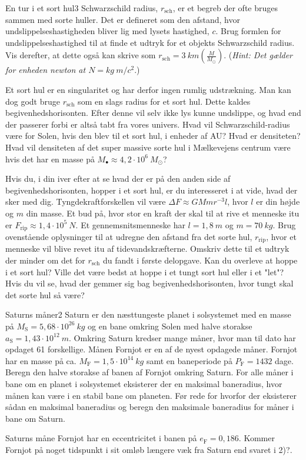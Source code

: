 \begin{opgave}{En tur i et sort hul}{3}
Schwarzschild radius, $r_\text{sch}$, er et begreb der ofte bruges sammen med sorte huller. Det er defineret som den afstand, hvor undslippelseshastigheden bliver lig med lysets hastighed, $c$.
	\opg Brug formlen for undslippelseshastighed til at finde et udtryk for et objekts Schwarzschild radius. Vis derefter, at dette også kan skrive som $r_\text{sch}=\SI{3}{km}\left(\frac{M}{M_{\odot}}\right)$. (\emph{Hint: Det gælder for enheden newton at $\si{N}=\si{kg}~\si{m/c^2}$}.)

Et sort hul er en singularitet og har derfor ingen rumlig udstrækning. Man kan dog godt bruge $r_\text{sch}$ som en slags radius for et sort hul. Dette kaldes begivenhedshorisonten. Efter denne vil selv ikke lys kunne undslippe, og hvad end der passerer forbi er altså tabt fra vores univers.
	\opg Hvad vil Schwarzschild-radius være for Solen, hvis den blev til et sort hul, i enheder af AU?
	\opg Hvad er densiteten?
	\opg Hvad vil densiteten af det super massive sorte hul i Mælkevejens centrum være hvis det har en masse på $M_{\bullet}\approx 4,2\cdot 10^6~M_{\odot}$?
	
Hvis du, i din iver efter at se hvad der er på den anden side af begivenhedshorisonten, hopper i et sort hul, er du interesseret i at vide, hvad der sker med dig. Tyngdekraftforskellen vil være $\Delta F \approx GMmr^{-3}l$, hvor $l$ er din højde og $m$ din masse. Et bud på, hvor stor en kraft der skal til at rive et menneske itu er $F_\text{rip}\approx 1,4\cdot 10^5~\si{N}$. Et gennemsnitsmenneske har $l=1,8~\si{m}$ og $m=70~\si{kg}$.
	\opg Brug ovenstående oplysninger til at udregne den afstand fra det sorte hul, $r_\text{rip}$, hvor et menneske vil blive revet itu af tidevandskræfterne. Omskriv dette til et udtryk der minder om det for $r_\text{sch}$ du fandt i første delopgave.
	\opg Kan du overleve at hoppe i et sort hul? Ville det være bedst at hoppe i et tungt sort hul eller i et "let"? Hvis du vil se, hvad der gemmer sig bag begivenhedshorisonten, hvor tungt skal det sorte hul så være?
\end{opgave}

\begin{opgave}{Saturns måner}{2}
Saturn er den næsttungeste planet i solsystemet med en masse på $M_\text{S} = 5,68\cdot 10^{26}~\si{kg}$ og en bane omkring Solen med halve storakse $a_\text{S} = 1,43\cdot 10^{12}~\si{m}$. Omkring Saturn kredser mange måner, hvor man til dato har opdaget 61 forskellige. Månen Fornjot er en af de nyest opdagede måner. Fornjot har en masse på ca. $M_\text{F} = 1,5\cdot 10^{14}~\si{kg}$ samt en baneperiode på $P_\text{F} = 1432$ dage.
	\opg Beregn den halve storakse af banen af Fornjot omkring Saturn. 
	\opg For alle måner i bane om en planet i solsystemet eksisterer der en maksimal baneradius, hvor månen kan være i en stabil bane om planeten. Før rede for hvorfor der eksisterer sådan en maksimal baneradius og beregn den maksimale baneradius for måner i bane om Saturn.

Saturns måne Fornjot har en eccentricitet i banen på $e_\text{F} = 0,186$.
	\opg Kommer Fornjot på noget tidspunkt i sit omløb længere væk fra Saturn end svaret i 2)?. 
\end{opgave}

